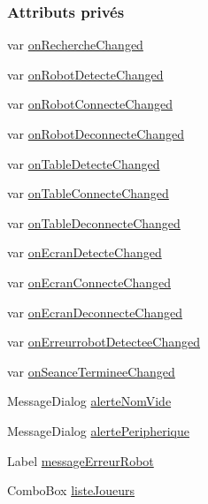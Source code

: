 \subsubsection*{Attributs privés}
\begin{DoxyCompactItemize}
\item 
var \hyperlink{class_fenetre_accueil_abb610541393cc6dfca82571d3ef73327}{on\+Recherche\+Changed}
\item 
var \hyperlink{class_fenetre_accueil_a955eb63bae52c73a7028b2d13e03b33c}{on\+Robot\+Detecte\+Changed}
\item 
var \hyperlink{class_fenetre_accueil_af4d9c650ab7f4b7647c726811d1c9a91}{on\+Robot\+Connecte\+Changed}
\item 
var \hyperlink{class_fenetre_accueil_a22694b0dbc46e88ff364b870318677f3}{on\+Robot\+Deconnecte\+Changed}
\item 
var \hyperlink{class_fenetre_accueil_a6664ac0dcc390378d429f4d251e4376a}{on\+Table\+Detecte\+Changed}
\item 
var \hyperlink{class_fenetre_accueil_a408ff279d8f4464b5e8a126883dc7c9e}{on\+Table\+Connecte\+Changed}
\item 
var \hyperlink{class_fenetre_accueil_a9322920a37d17dc69be146cac813bc59}{on\+Table\+Deconnecte\+Changed}
\item 
var \hyperlink{class_fenetre_accueil_a4137b2abea2372ce45abc326d052c592}{on\+Ecran\+Detecte\+Changed}
\item 
var \hyperlink{class_fenetre_accueil_a504db37f3b648b64b0edddeae5b18677}{on\+Ecran\+Connecte\+Changed}
\item 
var \hyperlink{class_fenetre_accueil_a3ed0440567ed9e41392b8b1919fdd662}{on\+Ecran\+Deconnecte\+Changed}
\item 
var \hyperlink{class_fenetre_accueil_aa832d467ae561d7479570b54c0a8f863}{on\+Erreurrobot\+Detectee\+Changed}
\item 
var \hyperlink{class_fenetre_accueil_a275732d42872aedcee4de9c519478c8f}{on\+Seance\+Terminee\+Changed}
\item 
Message\+Dialog \hyperlink{class_fenetre_accueil_a2c1e2eae79d759aa30f57aba4d1ca148}{alerte\+Nom\+Vide}
\item 
Message\+Dialog \hyperlink{class_fenetre_accueil_af6512303ffe11b5cf92ab76487bba051}{alerte\+Peripherique}
\item 
Label \hyperlink{class_fenetre_accueil_ad01ae3b3ed3ed5ce0ba7d3d0bfa3a8fc}{message\+Erreur\+Robot}
\item 
Combo\+Box \hyperlink{class_fenetre_accueil_a7efc0b38ac63b3981d2d201bc241d40d}{liste\+Joueurs}

\end{DoxyCompactItemize}
